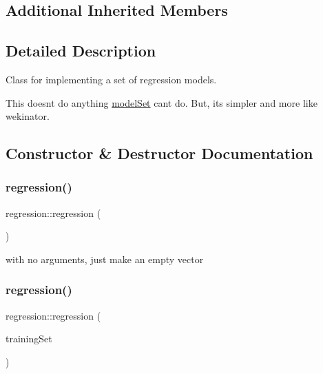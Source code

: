 \subsection*{Additional Inherited Members}


\subsection{Detailed Description}
Class for implementing a set of regression models.

This doesn\textquotesingle{}t do anything \hyperlink{classmodel_set}{model\+Set} can\textquotesingle{}t do. But, it\textquotesingle{}s simpler and more like wekinator. 

\subsection{Constructor \& Destructor Documentation}
\mbox{\label{classregression_a40993153659b1f637cf4d596df6e97ab}} 
\subsubsection{\texorpdfstring{regression()}{regression()}\hspace{0.1cm}{\footnotesize\ttfamily [1/3]}}
{\footnotesize\ttfamily regression\+::regression (\begin{DoxyParamCaption}{ }\end{DoxyParamCaption})}

with no arguments, just make an empty vector \mbox{\label{classregression_a029d23d2403773148373bb091d2734c2}} 
\subsubsection{\texorpdfstring{regression()}{regression()}\hspace{0.1cm}{\footnotesize\ttfamily [2/3]}}
{\footnotesize\ttfamily regression\+::regression (\begin{DoxyParamCaption}\item[{const std\+::vector$<$ \hyperlink{structtraining_example}{training\+Example} $>$ \&}]{training\+Set }\end{DoxyParamCaption})}

